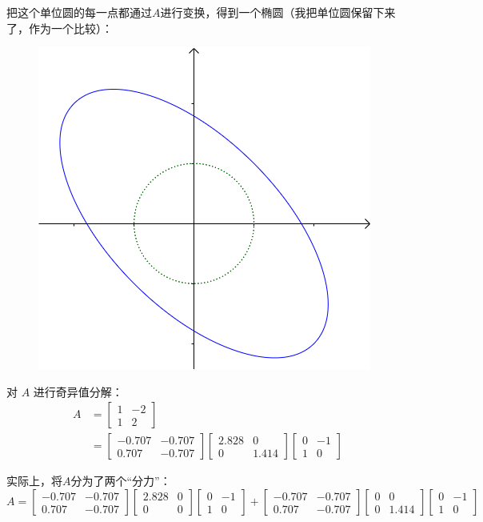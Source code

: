 \documentclass[12pt]{article}
\begin{document}
把这个单位圆的每一点都通过$A$进行变换，得到一个椭圆（我把单位圆保留下来了，作为一个比较）：
\begin{figure}[H]
    \centering
    \includegraphics[width=.3\textwidth]{fig/UnderstandSingularValue_2.png}
\end{figure} 

对 $A$ 进行奇异值分解：
\begin{align*}
    A &= \begin{bmatrix}1&-2\\1&2\end{bmatrix} \\
    &= \begin{bmatrix}-0.707&-0.707\\0.707&-0.707\end{bmatrix} 
    \begin{bmatrix}2.828&0\\0&1.414\end{bmatrix}
    \begin{bmatrix}0&-1\\1&0\end{bmatrix}
\end{align*}

实际上，将$A$分为了两个“分力”：
$$
 A  = \begin{bmatrix}-0.707&-0.707\\0.707&-0.707\end{bmatrix} 
    \begin{bmatrix}2.828&0\\0&0\end{bmatrix}
    \begin{bmatrix}0&-1\\1&0\end{bmatrix} + 
    \begin{bmatrix}-0.707&-0.707\\0.707&-0.707\end{bmatrix} 
    \begin{bmatrix}0&0\\0&1.414\end{bmatrix}
    \begin{bmatrix}0&-1\\1&0\end{bmatrix}
$$
\end{document}
